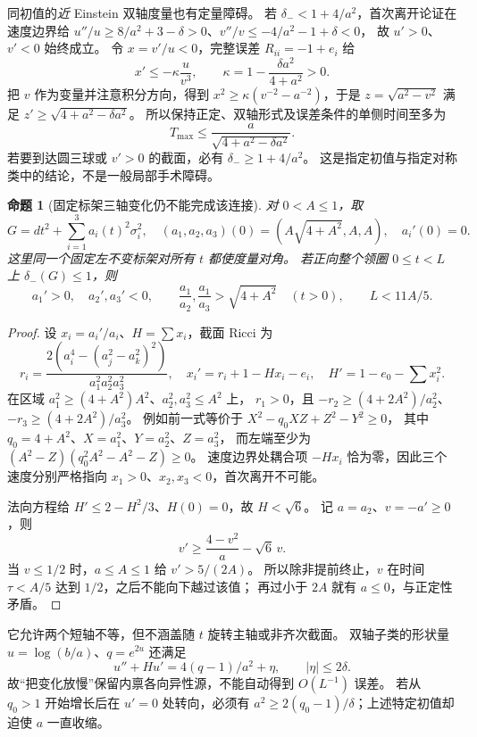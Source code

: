 \documentclass[UTF8,fontset=fandol,zihao=-4,oneside,openany]{ctexbook}
\theoremstyle{cjkplain}
\newtheorem{proposition}[theorem]{命题}
\numberwithin{equation}{chapter}
\begin{document}
同初值的\emph{近} Einstein 双轴度量也有定量障碍。
若 \(\delta_-<1+4/a^2\)，首次离开论证在速度边界给
\(u''/u\ge8/a^2+3-\delta>0\)、\(v''/v\le-4/a^2-1+\delta<0\)，
故 \(u'>0\)、\(v'<0\) 始终成立。
令 \(x=v'/u<0\)，完整误差 \(R_{ii}=-1+e_i\) 给
\[
x'\le-\kappa\frac{u}{v^3},\qquad
\kappa=1-\frac{\delta a^2}{4+a^2}>0.
\]
把 \(v\) 作为变量并注意积分方向，得到
\(x^2\ge\kappa(v^{-2}-a^{-2})\)，于是
\(z=\sqrt{a^2-v^2}\) 满足 \(z'\ge\sqrt{4+a^2-\delta a^2}\)。
所以保持正定、双轴形式及误差条件的单侧时间至多为
\[
T_{\max}\le\frac{a}{\sqrt{4+a^2-\delta a^2}}.
\]
若要到达圆三球或 \(v'>0\) 的截面，必有 \(\delta_-\ge1+4/a^2\)。
这是指定初值与指定对称类中的结论，不是一般局部手术障碍。

\begin{proposition}[固定标架三轴变化仍不能完成该连接]
对 \(0<A\le1\)，取
\[
G=dt^2+\sum_{i=1}^3a_i(t)^2\sigma_i^2,\quad
(a_1,a_2,a_3)(0)=(A\sqrt{4+A^2},A,A),\quad a_i'(0)=0.
\]
这里同一个固定左不变标架对所有 \(t\) 都使度量对角。
若正向整个领圈 \(0\le t<L\) 上 \(\delta_-(G)\le1\)，则
\[
a_1'>0,\quad a_2',a_3'<0,\qquad
\frac{a_1}{a_2},\frac{a_1}{a_3}>\sqrt{4+A^2}\quad(t>0),
\qquad L<11A/5.
\]
\end{proposition}
\begin{proof}
设 \(x_i=a_i'/a_i\)、\(H=\sum x_i\)，截面 Ricci 为
\[
r_i=\frac{2(a_i^4-(a_j^2-a_k^2)^2)}{a_1^2a_2^2a_3^2},
\quad x_i'=r_i+1-Hx_i-e_i,
\quad H'=1-e_0-\sum x_i^2.
\]
在区域 \(a_1^2\ge(4+A^2)A^2\)、\(a_2^2,a_3^2\le A^2\) 上，
\(r_1>0\)，且
\(-r_2\ge(4+2A^2)/a_2^2\)、\(-r_3\ge(4+2A^2)/a_3^2\)。
例如前一式等价于 \(X^2-q_0XZ+Z^2-Y^2\ge0\)，
其中 \(q_0=4+A^2\)、\(X=a_1^2\)、\(Y=a_2^2\)、\(Z=a_3^2\)，
而左端至少为 \((A^2-Z)(q_0^2A^2-A^2-Z)\ge0\)。
速度边界处耦合项 \(-Hx_i\) 恰为零，因此三个速度分别严格指向
\(x_1>0\)、\(x_2,x_3<0\)，首次离开不可能。

法向方程给 \(H'\le2-H^2/3\)、\(H(0)=0\)，故 \(H<\sqrt6\)。
记 \(a=a_2\)、\(v=-a'\ge0\)，则
\[
v'\ge\frac{4-v^2}{a}-\sqrt6\,v.
\]
当 \(v\le1/2\) 时，\(a\le A\le1\) 给 \(v'>5/(2A)\)。
所以除非提前终止，\(v\) 在时间 \(\tau<A/5\) 达到 \(1/2\)，之后不能向下越过该值；
再过小于 \(2A\) 就有 \(a\le0\)，与正定性矛盾。
\end{proof}
它允许两个短轴不等，但不涵盖随 \(t\) 旋转主轴或非齐次截面。
双轴子类的形状量 \(u=\log(b/a)\)、\(q=e^{2u}\) 还满足
\[
u''+Hu'=4(q-1)/a^2+\eta,\qquad|\eta|\le2\delta.
\]
故“把变化放慢”保留内禀各向异性源，不能自动得到 \(O(L^{-1})\) 误差。
若从 \(q_0>1\) 开始增长后在 \(u'=0\) 处转向，必须有
\(a^2\ge2(q_0-1)/\delta\)；上述特定初值却迫使 \(a\) 一直收缩。
\end{document}
